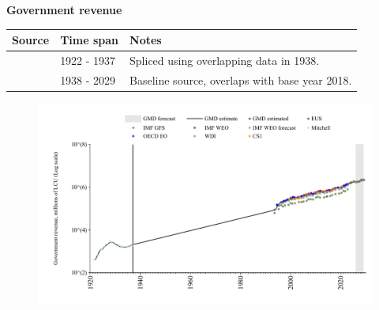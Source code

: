 \documentclass[12pt,a4paper,landscape]{article}
\begin{document}
\begin{adjustbox}{max totalsize={\paperwidth}{\paperheight},center}
\begin{minipage}[t][\textheight][t]{\textwidth}
\vspace*{0.5cm}
{}
\begin{center}
{\Large\bfseries Government revenue}
\end{center}
\vspace{0.5cm}
\begin{table}[H]
\centering
\small
\begin{tabular}{|l|l|l|}
\hline
\textbf{Source} & \textbf{Time span} & \textbf{Notes} \\
\hline
\rowcolor{white}\cite{Mitchell}& 1922 - 1937 &Spliced using overlapping data in 1938. \\
\rowcolor{lightgray}\cite{GMD_estimated}& 1938 - 2029 &Baseline source, overlaps with base year 2018. \\
\hline
\end{tabular}
\end{table}
\begin{figure}[H]
\centering
\includegraphics[width=\textwidth,height=0.6\textheight,keepaspectratio]{graphs/POL_govrev.pdf}
\end{figure}
\end{minipage}
\end{adjustbox}
\end{document}
